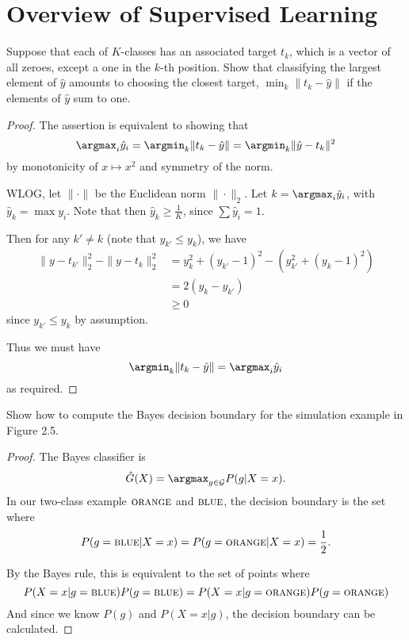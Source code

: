 \chapter{Overview of Supervised Learning}
\begin{exer}
    Suppose that each of $K$-classes has an associated target $t_k$, which is a vector of all zeroes, except a one in the $k$-th position.  Show that classifying the largest element of $\hat y$ amounts to choosing the closest target, $\min_k \| t_k - \hat y \|$ if the elements of $\hat y$ sum to one. 
\end{exer}

\begin{proof}
    The assertion is equivalent to showing that \[
    \argmax_i \hat y_i = \argmin_k \| t_k - \hat y \| = \argmin_k \|\hat y - t_k \|^2
\] by monotonicity of $x \mapsto x^2$ and symmetry of the norm.  

WLOG, let $\| \cdot \|$ be the Euclidean norm $\| \cdot \|_2$.  Let $k = \argmax_i \hat y_i$, with $\hat y_k = \max y_i$.  Note that then $\hat y_k \geq \frac{1}{K}$, since $\sum \hat y_i = 1$.   

Then for any $k' \neq k$ (note that $y_{k'} \leq y_k$), we have \begin{align*}
    \| y - t_{k'} \|_2^2 - \| y - t_k \|_2^2 &= y_k^2 + \left(y_{k'} - 1 \right)^2 - \left( y_{k'}^2 + \left(y_k - 1 \right)^2 \right) \\
    &= 2 \left(y_k - y_{k'}\right) \\
    &\geq 0
\end{align*} since $y_{k'} \leq y_k$ by assumption.

Thus we must have \[
    \argmin_k \| t_k - \hat y \| = \argmax_i \hat y_i
\] as required.    
\end{proof}

\begin{exer}
    Show how to compute the Bayes decision boundary for the simulation example in Figure 2.5.
\end{exer}

\begin{proof}
    The Bayes classifier is \[
        \hat G(X) = \argmax_{g \in \mathcal G} P(g | X = x ).
    \] In our two-class example $\textsc{orange}$ and $\textsc{blue}$, the decision boundary is the set where \[
        P(g=\textsc{blue} | X = x) = P(g =\textsc{orange} | X = x) = \frac{1}{2}.
    \]  
    
    By the Bayes rule, this is equivalent to the set of points where \[
        P(X = x | g = \textsc{blue}) P(g = \textsc{blue}) = P(X = x | g = \textsc{orange}) P(g = \textsc{orange})
    \] And since we know $P(g)$ and $P(X=x|g)$, the decision boundary can be calculated.
\end{proof}

